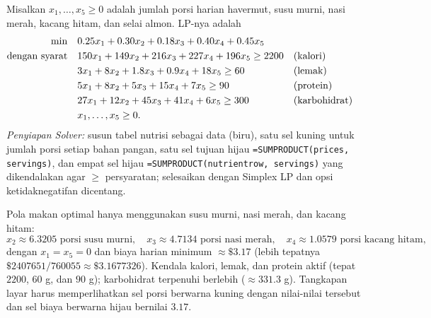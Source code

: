 Misalkan $x_1, \dots, x_5 \geq 0$ adalah jumlah porsi harian havermut, susu murni, nasi merah, kacang hitam, dan selai almon. LP-nya adalah
\begin{align*}
\min \quad & 0.25x_1 + 0.30x_2 + 0.18x_3 + 0.40x_4 + 0.45x_5\\
\mbox{dengan syarat}\quad & 150x_1 + 149x_2 + 216x_3 + 227x_4 + 196x_5 \geq 2200 && \mbox{(kalori)}\\
& 3x_1 + 8x_2 + 1.8x_3 + 0.9x_4 + 18x_5 \geq 60 && \mbox{(lemak)}\\
& 5x_1 + 8x_2 + 5x_3 + 15x_4 + 7x_5 \geq 90 && \mbox{(protein)}\\
& 27x_1 + 12x_2 + 45x_3 + 41x_4 + 6x_5 \geq 300 && \mbox{(karbohidrat)}\\
& x_1, \dots, x_5 \geq 0.
\end{align*}
\emph{Penyiapan Solver:} susun tabel nutrisi sebagai data (biru), satu sel kuning untuk jumlah porsi setiap bahan pangan, satu sel tujuan hijau \texttt{=SUMPRODUCT(prices, servings)}, dan empat sel hijau \texttt{=SUMPRODUCT(nutrientrow, servings)} yang dikendalakan agar $\geq$ persyaratan; selesaikan dengan Simplex LP dan opsi ketidaknegatifan dicentang.

Pola makan optimal hanya menggunakan susu murni, nasi merah, dan kacang hitam:
\[
x_2 \approx 6.3205 \text{ porsi susu murni}, \quad x_3 \approx 4.7134 \text{ porsi nasi merah}, \quad x_4 \approx 1.0579 \text{ porsi kacang hitam},
\]
dengan $x_1 = x_5 = 0$ dan biaya harian minimum $\approx \$3.17$ (lebih tepatnya $\$2407651/760055 \approx \$3.1677326$). Kendala kalori, lemak, dan protein aktif (tepat $2200$, $60$ g, dan $90$ g); karbohidrat terpenuhi berlebih ($\approx 331.3$ g). Tangkapan layar harus memperlihatkan sel porsi berwarna kuning dengan nilai-nilai tersebut dan sel biaya berwarna hijau bernilai $3.17$.



